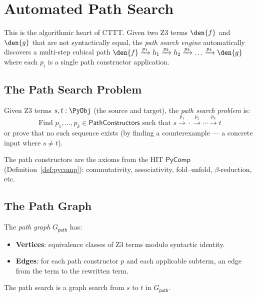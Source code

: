 
\chapter{Automated Path Search}
\label{ch:path-search}

This is the algorithmic heart of CTTT.  Given two Z3 terms $\den{f}$
and $\den{g}$ that are not syntactically equal, the \emph{path search
engine} automatically discovers a multi-step cubical path
$\den{f} \xrightarrow{p_1} h_1 \xrightarrow{p_2} h_2
\xrightarrow{p_3} \ldots \xrightarrow{p_k} \den{g}$
where each $p_i$ is a single path constructor application.

\section{The Path Search Problem}

\begin{definition}
Given Z3 terms $s, t : \PyObj$ (the source and target), the
\emph{path search problem} is:
\[
  \text{Find } p_1, \ldots, p_k \in \mathsf{PathConstructors}
  \text{ such that } s \xrightarrow{p_1} \cdot \xrightarrow{p_2}
  \cdots \xrightarrow{p_k} t
\]
or prove that no such sequence exists (by finding a
counterexample --- a concrete input where $s \neq t$).
\end{definition}

The path constructors are the axioms from the HIT $\mathsf{PyComp}$
(Definition~\ref{def:pycomp}): commutativity, associativity,
fold--unfold, $\beta$-reduction, etc.

\section{The Path Graph}

\begin{definition}
The \emph{path graph} $G_\mathsf{path}$ has:
\begin{itemize}
  \item \textbf{Vertices}: equivalence classes of Z3 terms modulo
    syntactic identity.
  \item \textbf{Edges}: for each path constructor $p$ and each
    applicable subterm, an edge from the term to the rewritten term.
\end{itemize}
The path search is a graph search from $s$ to $t$ in $G_\mathsf{path}$.
\end{definition}


